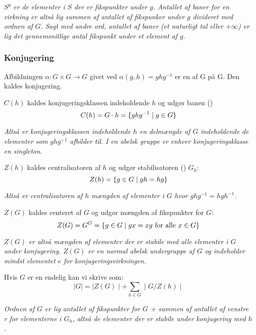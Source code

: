 \textit{$S^g$ er de elementer i $S$ der er fikspunkter under $g$. Antallet af
baner for en virkning er altså lig summen af antallet af fikspunker under $g$
divideret med ordnen af $G$. Sagt med andre ord, antallet af baner (et
naturligt tal eller $+\infty$) er lig det gennemsnitlige antal fikspunkt under
et element af $g$.}

\subsubsection{Konjugering}
\label{Konjugering}
Afbildningen $\alpha: G \times G \rightarrow G$ givet ved $\alpha(g,h) =
ghg^{-1}$ er en  af G på G. Den kaldes konjugering.

$C(h)$ kaldes konjugeringsklassen indeholdende $h$ og udgør banen
()
\begin{equation*}
  C(h) = G \cdot h = \{ ghg^{-1}\mid g\in G \}
\end{equation*}

\textit{Altså er konjugeringsklassen indeholdende $h$ en delmængde af $G$
indeholdende de elementer som $ghg^{-1}$ afbilder til. I en abelsk gruppe er
enhver konjugeringsklasse en singleton}.

$Z(h)$ kaldes centralisatoren af $h$ og udgør stabilisatoren ()
$G_h$:
\begin{equation*}
  Z(h) = \{ g \in G \mid gh = hg \}
\end{equation*}

\textit{Altså er centralisatoren af $h$ mængden af elementer i $G$ hvor
$ghg^{-1} = hgh^{-1}$.}

$Z(G)$ kaldes centeret af $G$ og udgør mængden af fikspunkter for $G$:
\begin{equation*}
  Z(G) = G^G = \{ g \in G\mid gx = xg \text{ for alle }x \in G \}
\end{equation*}

\textit{$Z(G)$ er altså mængden af elementer der er stabile med alle elementer i
$G$ under konjugering. $Z(G)$ er en normal abelsk undergruppe af $G$ og
indeholder mindst elementet $e$ for konjugeringsvirkningen.}

Hvis $G$ er en endelig  kan vi skrive  som:
\begin{equation*}
  \mid G\mid = \mid Z(G)\mid + \sum_{h \in G}\mid G/Z(h)\mid
\end{equation*}

\textit{Ordnen af $G$ er lig antallet af fikspunkter for $G$ + summen af
antallet af venstre r for elementerne i $G_h$,
altså de elementer der er stabile under konjugering med $h$.}

